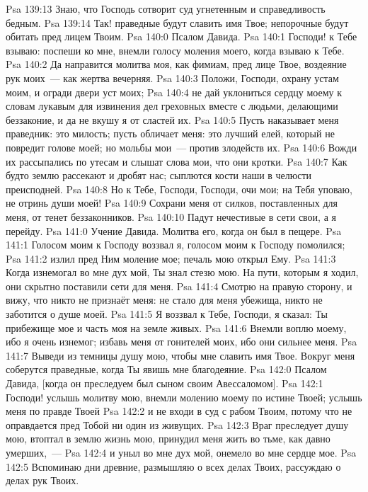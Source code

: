 \vs Psa 139:13 Знаю, что Господь сотворит суд угнетенным и справедливость бедным.
\vs Psa 139:14 Так! праведные будут славить имя Твое; непорочные будут обитать пред лицем Твоим.
\vs Psa 140:0 Псалом Давида.
\rsbpar\vs Psa 140:1 Господи! к Тебе взываю: поспеши ко мне, внемли голосу моления моего, когда взываю к Тебе.
\vs Psa 140:2 Да направится молитва моя, как фимиам, пред лице Твое, воздеяние рук моих~--- как жертва вечерняя.
\vs Psa 140:3 Положи, Господи, охрану устам моим, и огради двери уст моих;
\vs Psa 140:4 не дай уклониться сердцу моему к словам лукавым для извинения дел греховных вместе с людьми, делающими беззаконие, и да не вкушу я от сластей их.
\vs Psa 140:5 Пусть наказывает меня праведник: это милость; пусть обличает меня: это лучший елей, который не повредит голове моей; но мольбы мои~--- против злодейств их.
\vs Psa 140:6 Вожди их рассыпались по утесам и слышат слова мои, что они кротки.
\vs Psa 140:7 Как будто землю рассекают и дробят нас; сыплются кости наши в челюсти преисподней.
\vs Psa 140:8 Но к Тебе, Господи, Господи, очи мои; на Тебя уповаю, не отринь души моей!
\vs Psa 140:9 Сохрани меня от силков, поставленных для меня, от тенет беззаконников.
\vs Psa 140:10 Падут нечестивые в сети свои, а я перейду.
\vs Psa 141:0 Учение Давида. Молитва его, когда он был в пещере.
\rsbpar\vs Psa 141:1 Голосом моим к Господу воззвал я, голосом моим к Господу помолился;
\vs Psa 141:2 излил пред Ним моление мое; печаль мою открыл Ему.
\vs Psa 141:3 Когда изнемогал во мне дух мой, Ты знал стезю мою. На пути, которым я ходил, они скрытно поставили сети для меня.
\vs Psa 141:4 Смотрю на правую сторону, и вижу, что никто не признаёт меня: не стало для меня убежища, никто не заботится о душе моей.
\vs Psa 141:5 Я воззвал к Тебе, Господи, я сказал: Ты прибежище мое и часть моя на земле живых.
\vs Psa 141:6 Внемли воплю моему, ибо я очень изнемог; избавь меня от гонителей моих, ибо они сильнее меня.
\vs Psa 141:7 Выведи из темницы душу мою, чтобы мне славить имя Твое. Вокруг меня соберутся праведные, когда Ты явишь мне благодеяние.
\vs Psa 142:0 Псалом Давида, [когда он преследуем был сыном своим Авессаломом].
\rsbpar\vs Psa 142:1 Господи! услышь молитву мою, внемли молению моему по истине Твоей; услышь меня по правде Твоей
\vs Psa 142:2 и не входи в суд с рабом Твоим, потому что не оправдается пред Тобой ни один из живущих.
\vs Psa 142:3 Враг преследует душу мою, втоптал в землю жизнь мою, принудил меня жить во тьме, как давно умерших,~---
\vs Psa 142:4 и уныл во мне дух мой, онемело во мне сердце мое.
\vs Psa 142:5 Вспоминаю дни древние, размышляю о всех делах Твоих, рассуждаю о делах рук Твоих.
